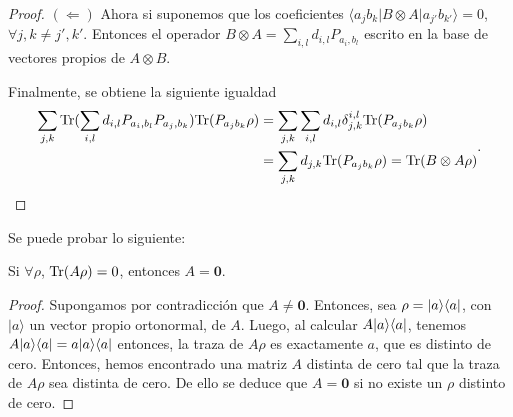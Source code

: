 \documentclass[12pt,oneside]{book}\raggedbottom{}
\begin{document}
\begin{proof}

\begin{comment}
	Ejemplo: Sea $Q=c_{0+}|0+\rala 0+|+c_{0-}|0-\rala 0-|+ c_{1+}|1+\rala 1+|+c_{1-}|1-\rala 1-|$ y 


$SQS=c_{0+}|+0\rala +0|+c_{0-}|-0\rala -0|+ c_{1+}|+1\rala +1|+c_{1-}|-1\rala -1|$ pero también supongamos que \[SQS=\sum_{j,k}\tr(SQS P_{d_{jk}})P_{d_{j,k}}\]

donde $\tr(SQS|0+\rala0+|)=\frac{1}{4}(c_{0+}+c_{0-}+c_{1+}+c_{1-})$




\end{comment}















$(\Leftarrow)$
Ahora si suponemos que los coeficientes  $\langle a_j b_k |B\otimes A|a_{j'}b_{k'}\rangle=0$,  $\forall j,k\ne j',k'$. Entonces el operador $B\otimes A=\sum_{i,l}d_{i,l}P_{a_i, b_l}$ escrito en la base de vectores propios de $A\otimes B$.

Finalmente, se obtiene la siguiente igualdad \[\begin{split}\sum_{j,k}{\rm Tr}( \sum_{i,l}d_{i,l}P_{a_i, b_l} P_{a_j,b_k}){\rm Tr}(P_{a_j b_k}\rho )&=\sum_{j,k}\sum_{i,l}d_{i,l}\delta_{j,k}^{i,l}{\rm Tr}(P_{a_j b_k}\rho )\\&=\sum_{j,k}d_{j,k}{\rm Tr}(P_{a_j b_k}\rho )={\rm Tr}(B\otimes A\rho)\end{split}.\]


\end{proof}

Se puede probar lo siguiente:


\begin{lemma}\label{lemma_traza_cero} Si $\forall\rho$, ${\rm Tr}(A\rho)=0$, entonces $A=\mathbf{0}$.\end{lemma}\begin{proof} Supongamos por contradicción que $A\ne \mathbf{0}$. Entonces, sea $\rho=|a\rangle \langle a|$, con $|a\rangle$ un vector propio ortonormal, de $A$. Luego, al calcular $A|a\rangle \langle a|$, tenemos $A|a\rangle \langle a|=a|a\rangle \langle a|$ entonces, la traza  de $A\rho$ es exactamente $a$, que es distinto de cero.
Entonces, hemos encontrado una matriz $A$ distinta de cero tal que la traza de $A\rho$ sea distinta de cero. De ello se deduce que $A = \mathbf{0}$ si no existe un $\rho$ distinto de cero.\end{proof}
\end{document}
